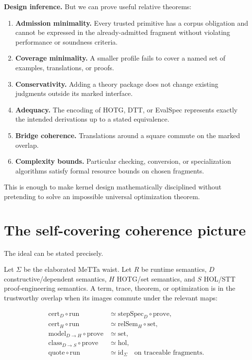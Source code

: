 \documentclass[11pt]{article}
\newcommand{\MeTTa}{\textup{MeTTa}}
\newcommand{\Infer}{\textbf{Design inference.}}
\begin{document}
\Infer{} But we can prove useful relative theorems:

\begin{enumerate}
\item \textbf{Admission minimality.}  Every trusted primitive has a corpus obligation and cannot be expressed in the already-admitted fragment without violating performance or soundness criteria.
\item \textbf{Coverage minimality.}  A smaller profile fails to cover a named set of examples, translations, or proofs.
\item \textbf{Conservativity.}  Adding a theory package does not change existing judgments outside its marked interface.
\item \textbf{Adequacy.}  The encoding of HOTG, DTT, or EvalSpec represents exactly the intended derivations up to a stated equivalence.
\item \textbf{Bridge coherence.}  Translations around a square commute on the marked overlap.
\item \textbf{Complexity bounds.}  Particular checking, conversion, or specialization algorithms satisfy formal resource bounds on chosen fragments.
\end{enumerate}

This is enough to make kernel design mathematically disciplined without pretending to solve an impossible universal optimization theorem.

\section{The self-covering coherence picture}

The ideal can be stated precisely.

Let \(\Sigma\) be the elaborated \MeTTa{} waist.  Let \(R\) be runtime semantics, \(D\) constructive/dependent semantics, \(H\) HOTG/set semantics, and \(S\) HOL/STT proof-engineering semantics.  A term, trace, theorem, or optimization is in the trustworthy overlap when its images commute under the relevant maps:

\begin{align*}
\mathrm{cert}_D \circ \mathrm{run} &\simeq \mathrm{stepSpec}_D \circ \mathrm{prove}, \\
\mathrm{cert}_H \circ \mathrm{run} &\simeq \mathrm{relSem}_H \circ \mathrm{set}, \\
\mathrm{model}_{D\to H} \circ \mathrm{prove} &\simeq \mathrm{set}, \\
\mathrm{class}_{D\to S} \circ \mathrm{prove} &\simeq \mathrm{hol}, \\
\mathrm{quote} \circ \mathrm{run} &\simeq \mathrm{id}_{\Sigma}\quad \text{on traceable fragments.}
\end{align*}
\end{document}
